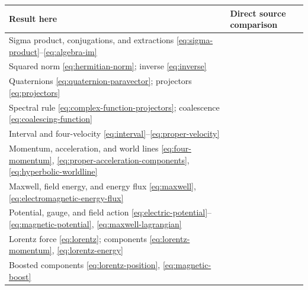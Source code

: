 \documentclass[11pt]{article}
\makeatletter
\numberwithin{equation}{section}
\newcommand{\citeat}[3]{%
  \href{\csname staurl@#1\endcsname\##3}{%
    \begin{NoHyper}\cite[#2]{#1}\end{NoHyper}}}
\makeatother
\begin{document}
\begin{center}
\small
\renewcommand{\arraystretch}{1.15}
\begin{tabular}{@{}>{\raggedright\arraybackslash}p{}>{\raggedright\arraybackslash}p{}@{}}
\toprule
Result here & Direct source comparison\\
\midrule
Sigma product, conjugations, and extractions
\eqref{eq:sigma-product}--\eqref{eq:algebra-im}
& \citeat{baylis2004}{pp.~4--6}{page=4}; \citeat{chappell-functions}{Eq.~(3)}{page=2}.\\
Squared norm \eqref{eq:hermitian-norm}; inverse \eqref{eq:inverse}
& \citeat{chappell-functions}{Eqs.~(46)--(47)}{page=11}.\\
Quaternions \eqref{eq:quaternion-paravector};
projectors \eqref{eq:projectors}
& \citeat{baylis-applications}{p.~92}{page=103}; \citeat{baylis-applications}{p.~121}{page=132}.\\
Spectral rule \eqref{eq:complex-function-projectors};
coalescence \eqref{eq:coalescing-function}
& \citeat{higham-functions}{pp.~3--4}{page=4}.\\
Interval and four-velocity
\eqref{eq:interval}--\eqref{eq:proper-velocity}
& \citeat{baylis-intro}{Eqs.~(7)--(8)}{page=8}.\\
Momentum, acceleration, and world lines
\eqref{eq:four-momentum}, \eqref{eq:proper-acceleration-components},
\eqref{eq:hyperbolic-worldline}
& \citeat{tong-relativity}{Eq.~(7.24)}{page=142}; \citeat{tong-relativity}{p.~141}{page=147}; \citeat{tong-relativity}{Eq.~(7.33), p.~143}{page=148}.\\
Maxwell, field energy, and energy flux
\eqref{eq:maxwell}, \eqref{eq:electromagnetic-energy-flux}
& \citeat{hestenes-spacetime}{Eq.~(177)}{page=29}; \citeat{hestenes-spacetime}{Eq.~(167)}{page=28}; \citeat{hestenes-spacetime}{Eq.~(180)}{page=30}.\\
Potential, gauge, and field action
\eqref{eq:electric-potential}--\eqref{eq:magnetic-potential},
\eqref{eq:maxwell-lagrangian}
& \citeat{tong-em}{p.~105}{page=113}; \citeat{tong-em}{Eq.~(5.42)}{page=133}; \citeat{tong-em}{Eq.~(5.43)}{page=134}; \citeat{tong-em}{Eqs.~(6.1)--(6.3)}{page=142}; \citeat{tong-em}{Eq.~(6.4)}{page=143}.\\
Lorentz force \eqref{eq:lorentz}; components
\eqref{eq:lorentz-momentum}, \eqref{eq:lorentz-energy}
& \citeat{baylis-charge}{Eq.~(2)}{page=4}; \citeat{tong-em}{Eqs.~(5.32)--(5.33)}{page=124}.\\
Boosted components
\eqref{eq:lorentz-position}, \eqref{eq:magnetic-boost}

\end{tabular}
\end{center}
\end{document}
